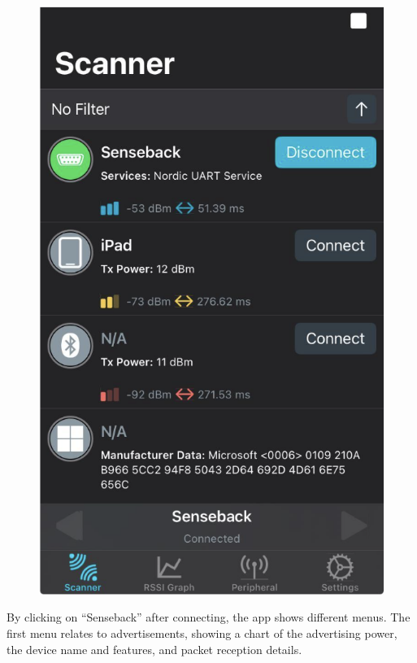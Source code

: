 \documentclass{Configuration_Files/PoliMi3i_thesis}
\begin{document}
\begin{figure}[H]
    \centering
    \includegraphics[scale=0.3]{Multicentral/7.png}
    \label{fig:nrf_connect_connected}
\end{figure}

By clicking on “Senseback” after connecting, the app shows different menus. The first menu relates to advertisements, showing a chart of the advertising power, the device name and features, and packet reception details.
\end{document}
